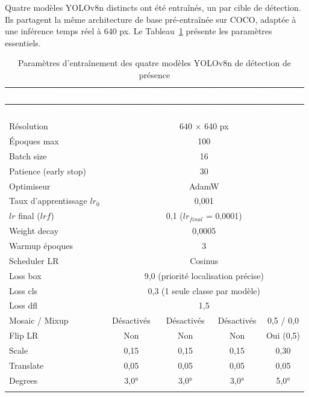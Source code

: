Quatre modèles YOLOv8n distincts ont été entraînés, un par cible de détection. Ils partagent la même architecture de base pré-entraînée sur COCO, adaptée à une inférence temps réel à 640 px. Le Tableau~\ref{tab:ch3-params-yolov8n} présente les paramètres essentiels.

\small
\begin{longtable}{|l|c|c|c|c|}
  \rowcolor{bleu_principal}
  \textcolor{white}{\textbf{Paramètre}} &
  \textcolor{white}{\textbf{CIN Recto}} &
  \textcolor{white}{\textbf{CIN Verso}} &
  \textcolor{white}{\textbf{Passeport}} &
  \textcolor{white}{\textbf{Visage}} \\
  \endfirsthead
  \rowcolor{bleu_principal}
  \textcolor{white}{\textbf{Paramètre}} &
  \textcolor{white}{\textbf{CIN Recto}} &
  \textcolor{white}{\textbf{CIN Verso}} &
  \textcolor{white}{\textbf{Passeport}} &
  \textcolor{white}{\textbf{Visage}} \\
  \endhead
  \midrule
  Résolution & \multicolumn{4}{c|}{640 $\times$ 640 px} \\
  \midrule
  \rowcolor{gris_leger}
  Époques max & \multicolumn{4}{c|}{100} \\
  \midrule
  Batch size & \multicolumn{4}{c|}{16} \\
  \midrule
  \rowcolor{gris_leger}
  Patience (early stop) & \multicolumn{4}{c|}{30} \\
  \midrule
  Optimiseur & \multicolumn{4}{c|}{AdamW} \\
  \midrule
  \rowcolor{gris_leger}
  Taux d'apprentissage $lr_0$ & \multicolumn{4}{c|}{0,001} \\
  \midrule
  $lr$ final ($lrf$) & \multicolumn{4}{c|}{0,1 \quad ($lr_{final}$ = 0,0001)} \\
  \midrule
  \rowcolor{gris_leger}
  Weight decay & \multicolumn{4}{c|}{0,0005} \\
  \midrule
  Warmup époques & \multicolumn{4}{c|}{3} \\
  \midrule
  \rowcolor{gris_leger}
  Scheduler LR & \multicolumn{4}{c|}{Cosinus} \\
  \midrule
  Loss box & \multicolumn{4}{c|}{9,0 \quad (priorité localisation précise)} \\
  \midrule
  \rowcolor{gris_leger}
  Loss cls & \multicolumn{4}{c|}{0,3 \quad (1 seule classe par modèle)} \\
  \midrule
  Loss dfl & \multicolumn{4}{c|}{1,5} \\
  \midrule
  \rowcolor{gris_leger}
  Mosaic / Mixup & Désactivés & Désactivés & Désactivés & 0,5 / 0,0 \\
  \midrule
  Flip LR & Non & Non & Non & Oui (0,5) \\
  \midrule
  \rowcolor{gris_leger}
  Scale & 0,15 & 0,15 & 0,15 & 0,30 \\
  \midrule
  Translate & 0,05 & 0,05 & 0,05 & 0,05 \\
  \midrule
  \rowcolor{gris_leger}
  Degrees & 3,0° & 3,0° & 3,0° & 5,0° \\
  \bottomrule
  \caption{Paramètres d'entraînement des quatre modèles YOLOv8n de détection de présence}
  \label{tab:ch3-params-yolov8n}
\end{longtable}
\normalsize

